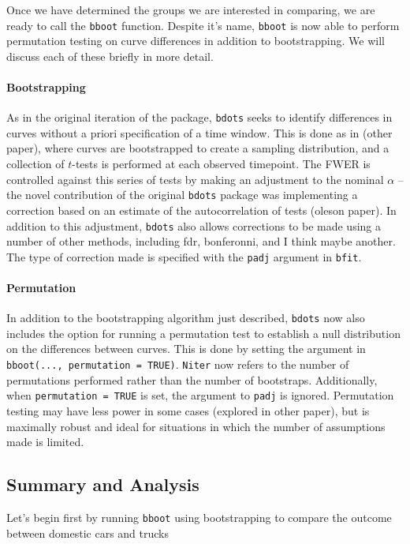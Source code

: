 \documentclass{article}
\newcommand{\xt}{\texttt}%
\begin{document}
Once we have determined the groups we are interested in comparing, we are ready to call the \xt{bboot} function. Despite it's name, \xt{bboot} is now able to perform permutation testing on curve differences in addition to bootstrapping. We will discuss each of these briefly in more detail.

\paragraph{Bootstrapping} As in the original iteration of the package, \xt{bdots} seeks to identify differences in curves without a priori specification of a time window. This is done as in (other paper), where curves are bootstrapped to create a sampling distribution, and a collection of $t$-tests is performed at  each observed timepoint. The FWER is controlled against this series of tests by making an adjustment to the nominal $\alpha$ -- the novel contribution of the original \xt{bdots} package was implementing a correction based on an estimate of the autocorrelation of tests (oleson paper). In addition to this adjustment, \xt{bdots} also allows corrections to be made using a number of other methods, including fdr, bonferonni, and I think maybe another. The type of correction made is specified with the \xt{padj} argument in \xt{bfit}.

\paragraph{Permutation} In addition to the bootstrapping algorithm just described, 
\xt{bdots} now also includes the option for running a permutation test to establish a null distribution on the differences between curves. This is done by setting the argument in \xt{bboot(..., permutation = TRUE)}.  \xt{Niter} now refers to the number of permutations performed rather than the number of bootstraps. Additionally, when \xt{permutation = TRUE} is set, the argument to \xt{padj} is ignored. Permutation testing may have less power in some cases (explored in other paper), but is maximally robust and ideal for situations in which the number of assumptions made is limited.

\subsection{Summary and Analysis}

Let's begin first by running \xt{bboot} using bootstrapping to compare the outcome between  domestic cars and trucks
\end{document}
